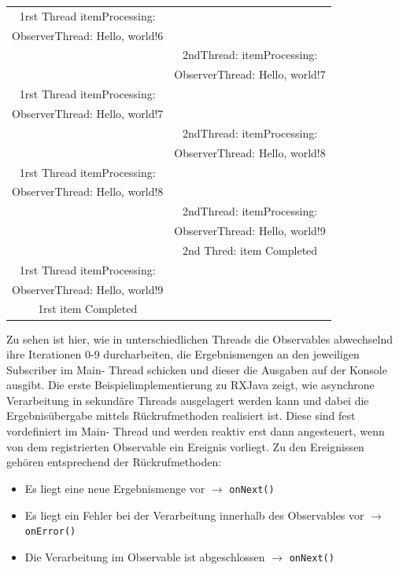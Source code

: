 \documentclass[12pt,oneside,a4paper,bibtotoc,liststotoc]{scrreprt}
\begin{document}
\begin{table}[h!]
\begin{center}
\begin{tabular}{cc}
1rst Thread itemProcessing:&  \\
ObserverThread: Hello, world!6&  \\
                               		& 2ndThread: itemProcessing:\\
                               		& ObserverThread: Hello, world!7\\
1rst Thread itemProcessing:&  \\
ObserverThread: Hello, world!7&  \\
                               		& 2ndThread: itemProcessing:\\
                               		& ObserverThread: Hello, world!8\\
1rst Thread itemProcessing:&  \\
ObserverThread: Hello, world!8&  \\
                               		& 2ndThread: itemProcessing:\\
                               		& ObserverThread: Hello, world!9\\
                               		& 2nd Thred: item Completed\\
1rst Thread itemProcessing:&  \\
ObserverThread: Hello, world!9&  \\
1rst item Completed&  \\
\bottomrule
    \end{tabular}
  \end{center}
\end{table}
\newpage
Zu sehen ist hier, wie in unterschiedlichen Threads die Observables abwechselnd ihre Iterationen 0-9 durcharbeiten, die Ergebnismengen an den jeweiligen Subscriber im Main- Thread schicken und dieser die Ausgaben auf der Konsole ausgibt.  
Die erste Beispielimplementierung zu RXJava zeigt, wie asynchrone Verarbeitung in sekundäre Threads ausgelagert werden kann und dabei die Ergebnisübergabe mittels Rückrufmethoden realisiert ist. Diese sind fest vordefiniert im Main- Thread und werden reaktiv erst dann angesteuert, wenn von dem registrierten Observable ein Ereignis vorliegt. Zu den Ereignissen gehören entsprechend der Rückrufmethoden:
\begin{itemize}
\item Es liegt eine neue Ergebnismenge vor $\rightarrow$ \texttt{onNext()}
\item Es liegt ein Fehler bei der Verarbeitung innerhalb des Observables vor $\rightarrow$ \texttt{onError()}
\item Die Verarbeitung im Observable ist abgeschlossen $\rightarrow$ \texttt{onNext()}
\end{itemize}
\end{document}
